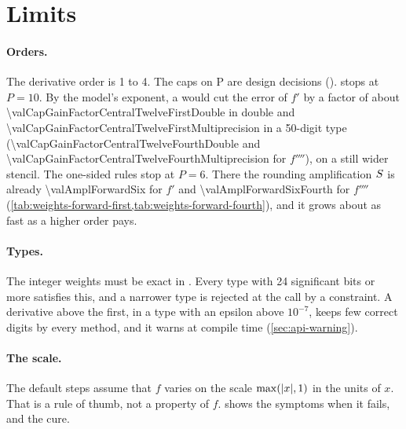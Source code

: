 \section{Limits}\label{sec:guarantees-limits}

\paragraph{Orders.} The derivative order is 1 to 4. The caps on P are design decisions
().  stops at $P = 10$. By the model's exponent, a 
would cut the error of $f'$ by a factor of about \num{\valCapGainFactorCentralTwelveFirstDouble} in double and
\num{\valCapGainFactorCentralTwelveFirstMultiprecision} in a 50-digit type
(\num{\valCapGainFactorCentralTwelveFourthDouble} and \num{\valCapGainFactorCentralTwelveFourthMultiprecision} for
$f''''$), on a still wider stencil. The one-sided rules stop at $P = 6$. There the rounding amplification $S$ is
already \num{\valAmplForwardSix} for $f'$ and \num{\valAmplForwardSixFourth} for $f''''$
(\cref{tab:weights-forward-first,tab:weights-forward-fourth}), and it grows about as fast as a higher order pays.

\paragraph{Types.} The integer weights must be exact in . Every type with 24 significant bits or more
satisfies this, and a narrower type is rejected at the call by a constraint. A derivative above the first, in a type
with an epsilon above $10^{-7}$, keeps few correct digits by every method, and it warns at compile time
(\cref{sec:api-warning}).

\paragraph{The scale.} The default steps assume that $f$ varies on the scale $\max(\lvert x \rvert, 1)$ in the units of $x$.
That is a rule of thumb, not a property of $f$.  shows the symptoms when it fails, and the
cure.

